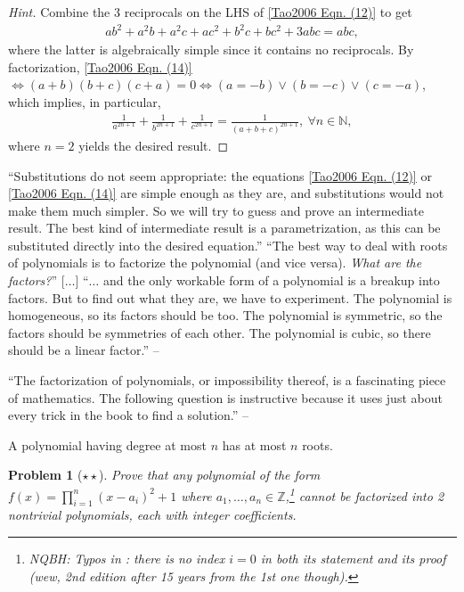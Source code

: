 \documentclass[oneside]{book}
\numberwithin{equation}{section}
\newtheorem{problem}{Problem}[section]
\begin{document}
\begin{proof}[Hint] Combine the 3 reciprocals on the LHS of \eqref{Tao2006 Eqn. (12)} to get
	\begin{align}
		\label{Tao2006 Eqn. (14)}
		ab^2 + a^2b + a^2c + ac^2 + b^2c + bc^2 + 3abc = abc,
	\end{align}
	where the latter is algebraically simple since it contains no reciprocals. By factorization, \eqref{Tao2006 Eqn. (14)} $\Leftrightarrow(a + b)(b + c)(c + a) = 0\Leftrightarrow(a = -b)\lor(b = -c)\lor(c = -a)$, which implies, in particular,
	\begin{align*}
		\frac{1}{a^{2n+1}} + \frac{1}{b^{2n+1}} + \frac{1}{c^{2n+1}} = \frac{1}{(a + b + c)^{2n + 1}},\ \forall n\in\mathbb{N},
	\end{align*}
	where $n = 2$ yields the desired result.
\end{proof}
``Substitutions do not seem appropriate: the equations \eqref{Tao2006 Eqn. (12)} or \eqref{Tao2006 Eqn. (14)} are simple enough as they are, and substitutions would not make them much simpler. So we will try to guess and prove an intermediate result. The best kind of intermediate result is a parametrization, as this can be substituted directly into the desired equation.'' ``The best way to deal with roots of polynomials is to factorize the polynomial (and vice versa). \textit{What are the factors?}'' [$\ldots$] ``$\ldots$ and the only workable form of a polynomial is a breakup into factors. But to find out what they are, we have to experiment. The polynomial is homogeneous, so its factors should be too. The polynomial is symmetric, so the factors should be symmetries of each other. The polynomial is cubic, so there should be a linear factor.'' -- \cite[p. 44]{Tao2006}

``The factorization of polynomials, or impossibility thereof, is a fascinating piece of mathematics. The following question is instructive because it uses just about every trick in the book to find a solution.'' -- \cite[p. 45]{Tao2006}

A polynomial having degree at most $n$ has at most $n$ roots.
\begin{problem}[$\star\star$]
	Prove that any polynomial of the form $f(x) = \prod_{i=1}^n (x - a_i)^2 + 1$ where $a_1,\ldots,a_n\in\mathbb{Z}$,\footnote{NQBH: Typos in \cite[Problem. 3.4, p. 45.]{Tao2006}: there is no index $i = 0$ in both its statement and its proof (wew,  2nd edition after 15 years from the 1st one though).} cannot be factorized into 2 nontrivial polynomials, each with integer coefficients.
\end{problem}
\end{document}
